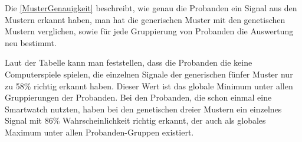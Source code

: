 Die \autoref{MusterGenauigkeit} beschreibt, wie genau die Probanden ein Signal aus den Mustern erkannt haben, man hat die generischen Muster mit den genetischen Mustern verglichen, sowie f{\"u}r jede Gruppierung von Probanden die Auswertung neu bestimmt. 

Laut der Tabelle kann man feststellen, dass die Probanden die keine Computerspiele spielen, die einzelnen Signale der generischen f{\"u}nfer Muster nur zu 58\% richtig erkannt haben. 
Dieser Wert ist das globale Minimum unter allen Gruppierungen der Probanden.
Bei den Probanden, die schon einmal eine Smartwatch nutzten, haben bei den genetischen dreier Mustern ein einzelnes Signal mit 86\% Wahrscheinlichkeit richtig erkannt, der auch als globales Maximum unter allen Probanden-Gruppen existiert.


